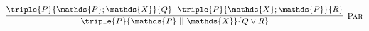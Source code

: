 \[
\infer[\textsc{Par}]
{
	\triple
	{P}
	{\mathds{P}\ ||\ \mathds{X}}
	{Q \lor R}
}
{
	\triple
	{P}
	{\mathds{P}; \mathds{X}}
	{Q}\ \
	\triple
	{P}
	{\mathds{X}; \mathds{P}}
	{R}
}
\]

\iffalse
\begin{gather*}
\color{blue} \left\lbrace \boxed{\pvar{a} \mapsto 0}^r \right\rbrace \\
\begin{array}{c || c}
\begin{array}{l}
\color{blue} \left\lbrace \pvar{a} \mapsto n_r \right\rbrace \\
\pderef{\pvar{x}}{\pvar{a}}; \\
\pmutate{\pvar{a}}{\pvar{x} + 1} \\
\color{blue} \left\lbrace \pvar{a} \mapsto n_r + 1 \right\rbrace
\end{array}
&
\begin{array}{l}
\color{blue} \left\lbrace \pvar{a} \mapsto n_r \right\rbrace \\
\pmutate{\pvar{a}}{2} \\
\color{blue} \left\lbrace \pvar{a} \mapsto 2 \right\rbrace
\end{array}
\end{array} \\
\color{blue} \left\lbrace \boxed{\pvar{a} \mapsto 2 \lor \pvar{a} \mapsto 3}^r \right\rbrace
\end{gather*}

\begin{gather*}
\color{blue} \left\lbrace \boxed{\pvar{a} \mapsto 0}^r \right\rbrace \\
\begin{array}{c || c || c}
\begin{array}{l}
\color{blue} \left\lbrace \pvar{a} \mapsto n_r \right\rbrace \\
\pderef{\pvar{x}}{\pvar{a}}; \\
\pmutate{\pvar{a}}{\pvar{x} + 1} \\
\color{blue} \left\lbrace \pvar{a} \mapsto n_r + 1 \right\rbrace
\end{array}
&
\begin{array}{l}
\color{blue} \left\lbrace \pvar{a} \mapsto n_r \right\rbrace \\
\pmutate{\pvar{a}}{2} \\
\color{blue} \left\lbrace \pvar{a} \mapsto 2 \right\rbrace
\end{array}
&
\begin{array}{l}
\color{blue} \left\lbrace \pvar{a} \mapsto n_r \right\rbrace \\
\pmutate{\pvar{a}}{5} \\
\color{blue} \left\lbrace \pvar{a} \mapsto 5 \right\rbrace
\end{array}
\end{array} \\
\color{blue} \left\lbrace \boxed{\pvar{a} \mapsto 2 \lor \pvar{a} \mapsto 3 \lor \pvar{a} \mapsto 5 \lor \pvar{a} \mapsto 6}^r \right\rbrace
\end{gather*}
\fi